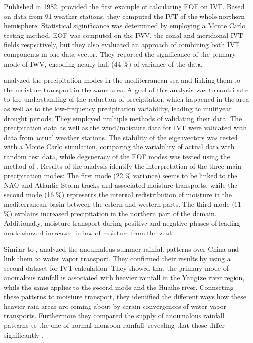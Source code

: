 Published in 1982, \citeauthor{salstein_modes_1983} provided the first example of calculating EOF on IVT. 
Based on data from 91 weather stations, they computed the IVT of the whole northern hemisphere. 
Statistical siginificance was determined by employing a Monte Carlo testing method. 
EOF was computed on the IWV, the zonal and meridional IVT fields respectively, but they also evaluated an approach of combining both IVT components in one data vector. 
They reported the significance of the primary mode of IWV, encoding nearly half (44 \%) of variance of the data. 


\citeauthor{fernandez_analysis_2003} analyzed the precipitation modes in the mediterranean sea and linking them to the moisture transport in the same area. 
A goal of this analysis was to contribute to the understanding of the reduction of precipitation which happened in the area as well as to the low-frequency precipitation variability, leading to multiyear drought periods.
They employed multiple methods of validating their data: The precipitation data as well as the wind/moisture data for IVT were validated with data from actual weather stations. 
The stability of the eigenvectors was tested with a Monte Carlo simulation, comparing the variability of actual data with random test data, while degeneracy of the EOF modes was tested using the method of \citeauthor{north_sampling_1982} \cite{north_sampling_1982}. 
Results of the analysis identify the interpretation of the three main precipitation modes:
The first mode (22 \% variance) seems to be linked to the NAO and Atlantic Storm tracks and associated moisture transports, while the second mode (16 \%) represents the internal redistribution of moisture in the mediterranean basin between the estern and western parts.  
The third mode (11 \%) explains increased precipitation in the northern part of the domain. 
Additionally, moisture transport during positive and negative phases of leading mode showed increased inflow of moisture from the west \cite{fernandez_analysis_2003}. 


Similar to \cite{fernandez_analysis_2003}, \citeauthor{zhou_atmospheric_2005} analyzed the anoumalous summer rainfall patterns over China and link them to water vapor transport. 
They confirmed their results by using a second dataset for IVT calculation. 
They showed that the primary mode of anomalous rainfall is associated with heavier rainfall in the Yangtze river region, while the same applies to the second mode and the Huaihe river. 
Connecting these patterns to moisture transport, they identified the different ways how these heavier rain areas are coming about by cerain convergences of water vapor transports. 
Furthermore they compared the supply of anoumalous rainfall patterns to the one of normal monsoon rainfall, revealing that those differ significantly \cite{zhou_atmospheric_2005}.


